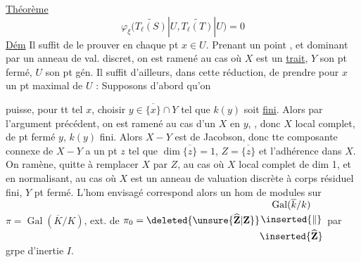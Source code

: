 \uline{Théorème}
\[
\varphi_\xi\bigl(\widetilde{T_\ell(S)}|U,\widetilde{T_\ell(T)}|U\bigr)=0
\]
 \uline{Dém} Il suffit de le prouver en chaque pt $x\in U$.
Prenant un point  , et dominant par un anneau de val. discret, on est ramené au cas où $X$ est un \uline{trait}, $Y$ son pt fermé, $U$ son pt gén. Il suffit d'ailleurs, dans cette réduction, de prendre pour $x$ un pt maximal de $U$ : Supposons  d'abord qu'on

puisse, pour tt tel $x$, choisir $y\in\overline{\{x\}}\cap Y$ tel que $k(y)$ soit \uline{fini}.  Alors par l'argument précédent, on est ramené au cas d'un   $X$ en $y$, , donc $X$ local complet, de pt fermé $y$,  $k(y)$ fini. Alors $X-Y$ est de Jacobson, donc tte composante connexe de $X-Y$ a un pt $z$ tel que $\dim\overline{\{z\}}=1$,  $Z=\overline{\{z\}}$ et  l'adhérence dans $X$. On  ramène,  quitte à remplacer $X$ par $Z$, au cas où $X$ local complet de dim 1, et en normalisant, au cas où $X$ est  un anneau de valuation discrète  à corps résiduel fini, $Y$ pt fermé. L'hom envisagé correspond alors  un hom de modules sur $\pi=\operatorname{Gal}(\overline K/K)$, ext. de $\pi_0=\deleted{\unsure{\widehat{\mathbf Z}|\mathbf Z}}\begin{gathered}\operatorname{Gal}(\overline k/k)\\ \inserted{\Vert}\\ \inserted{\widehat{\mathbf Z}}\end{gathered}$ par grpe d'inertie $I$.


